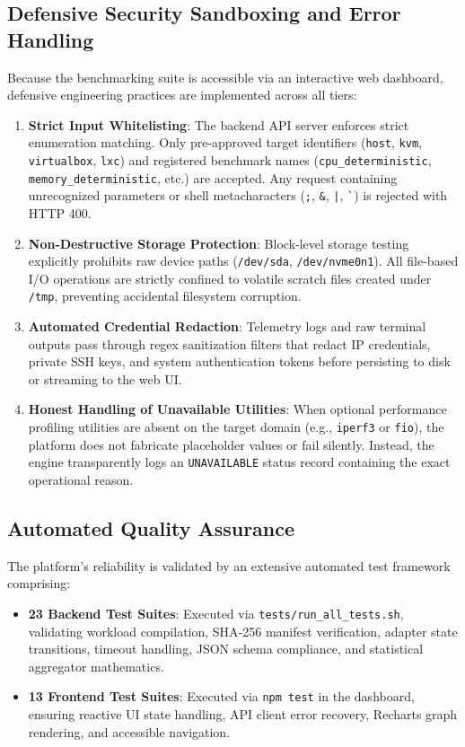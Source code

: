 \subsection{Defensive Security Sandboxing and Error Handling}
\label{subsec:security_sandboxing}

Because the benchmarking suite is accessible via an interactive web dashboard, defensive engineering practices are implemented across all tiers:
\begin{enumerate}
    \item \textbf{Strict Input Whitelisting}: The backend API server enforces strict enumeration matching. Only pre-approved target identifiers (\texttt{host}, \texttt{kvm}, \texttt{virtualbox}, \texttt{lxc}) and registered benchmark names (\texttt{cpu\_deterministic}, \texttt{memory\_deterministic}, etc.) are accepted. Any request containing unrecognized parameters or shell metacharacters (\verb|;|, \verb|&|, \verb!|!, \verb|`|) is rejected with HTTP 400.
    \item \textbf{Non-Destructive Storage Protection}: Block-level storage testing explicitly prohibits raw device paths (\texttt{/dev/sda}, \allowbreak\texttt{/dev/nvme0n1}). All file-based I/O operations are strictly confined to volatile scratch files created under \texttt{/tmp}, preventing accidental filesystem corruption.
    \item \textbf{Automated Credential Redaction}: Telemetry logs and raw terminal outputs pass through regex sanitization filters that redact IP credentials, private SSH keys, and system authentication tokens before persisting to disk or streaming to the web UI.
    \item \textbf{Honest Handling of Unavailable Utilities}: When optional performance profiling utilities are absent on the target domain (e.g., \texttt{iperf3} or \texttt{fio}), the platform does not fabricate placeholder values or fail silently. Instead, the engine transparently logs an \texttt{UNAVAILABLE} status record containing the exact operational reason.
\end{enumerate}

\subsection{Automated Quality Assurance}
\label{subsec:quality_assurance}

The platform's reliability is validated by an extensive automated test framework comprising:
\begin{itemize}
    \item \textbf{23 Backend Test Suites}: Executed via \texttt{tests/run\_all\_tests.sh}, validating workload compilation, SHA-256 manifest verification, adapter state transitions, timeout handling, JSON schema compliance, and statistical aggregator mathematics.
    \item \textbf{13 Frontend Test Suites}: Executed via \texttt{npm test} in the dashboard, ensuring reactive UI state handling, API client error recovery, Recharts graph rendering, and accessible navigation.
\end{itemize}
